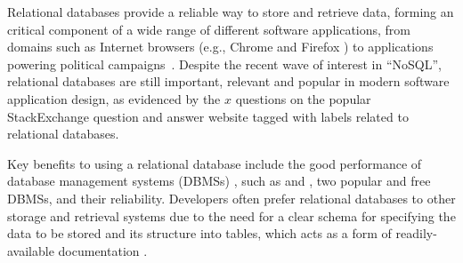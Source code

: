 %
%
%
%

Relational databases provide a reliable way to store and retrieve data, forming an critical component of a wide range of different software applications, from domains such as Internet browsers (e.g., Chrome \cite{} and Firefox \cite{}) to applications powering political campaigns~\cite{Butler2012}. Despite the recent wave of interest in ``NoSQL'', relational databases are still important, relevant and popular in modern software application design, as evidenced by the $x$ questions on the popular StackExchange question and answer website tagged with labels related to relational databases.

Key benefits to using a relational database include the good performance of database management systems (DBMSs) \cite{Abrahami2015}, such as \Postgres and \SQLite, two popular and free DBMSs, and their reliability. Developers often prefer relational databases to other storage and retrieval systems due to the need for a clear schema for specifying the data to be stored and its structure into tables, which acts as a form of readily-available documentation \cite{}. 

